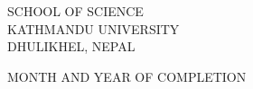 \documentclass[a4paper,12pt]{report}    %
\begin{document}
{{\vspace{2cm}
{\normalsize
\begin{center}
SCHOOL OF SCIENCE\\
KATHMANDU UNIVERSITY\\
DHULIKHEL, NEPAL\\
\end{center}
}

\begin{center}
	{\color{red} MONTH AND YEAR OF COMPLETION}
\end{center}

}
}

\thispagestyle{empty}	%

%

%

\newpage



%

%



\tableofcontents


\listoffigures

\listoftables

\newpage


\newpage
{}

\newpage

\newpage

\newpage



\renewcommand{\bibname}{\centering REFERENCES}


\end{document}
